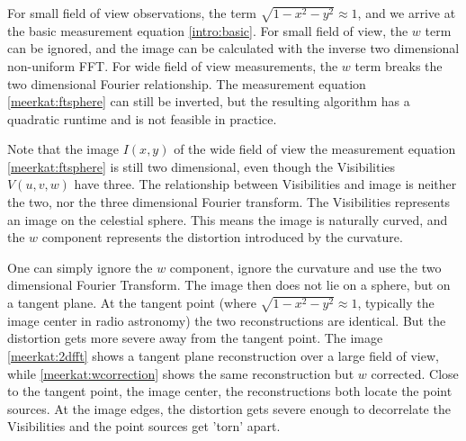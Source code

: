 For small field of view observations, the term $\sqrt{1 - x^2 - y ^2} \approx 1$, and we arrive at the basic measurement equation \eqref{intro:basic}. For small field of view, the $w$ term can be ignored, and the image can be calculated with the inverse two dimensional non-uniform FFT. For wide field of view measurements, the $w$ term breaks the two dimensional Fourier relationship. The measurement equation \eqref{meerkat:ftsphere} can still be inverted, but the resulting algorithm has a quadratic runtime and is not feasible in practice.

Note that the image $I(x,y)$ of the wide field of view the measurement equation \eqref{meerkat:ftsphere} is still two dimensional, even though the Visibilities $V(u, v, w)$ have three. The relationship between Visibilities and image is neither the two, nor the three dimensional Fourier transform. The Visibilities represents an image on the celestial sphere. This means the image is naturally curved, and the $w$ component represents the distortion introduced by the curvature.

One can simply ignore the $w$ component, ignore the curvature and use the two dimensional Fourier Transform. The image then does not lie on a sphere, but on a tangent plane. At the tangent point (where $\sqrt{1 - x^2 - y ^2} \approx 1$, typically the image center in radio astronomy) the two reconstructions are identical. But the distortion gets more severe away from the tangent point. The image \ref{meerkat:2dfft} shows a tangent plane reconstruction over a large field of view, while \ref{meerkat:wcorrection} shows the same reconstruction but $w$ corrected. Close to the tangent point, the image center, the reconstructions both locate the point sources. At the image edges, the distortion gets severe enough to decorrelate the Visibilities and the point sources get 'torn' apart.


